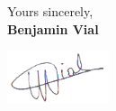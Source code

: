 \documentclass[]{cv} %
\begin{document}
Yours sincerely,\\[1.5em]


\textbf{Benjamin Vial}

\includegraphics[width=3cm]{sig.png}
% 
\end{document}
